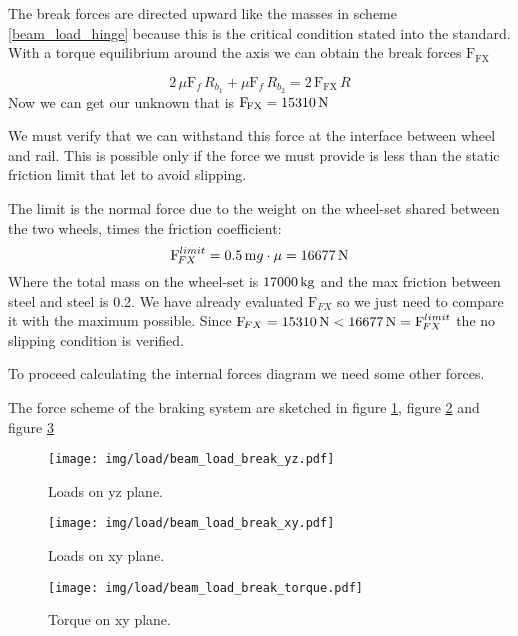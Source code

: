 \documentclass[a4paper,12pt]{article}
\begin{document}
The break forces are directed upward like the masses in scheme \ref{beam_load_hinge} because this is the critical condition stated into the standard.
\\With a torque equilibrium around the axis we can obtain the break forces $\text{F}_{\!\text{FX}}$

\begin{equation}
2\, \mu \text{F}_f \, R_{b_1} + \mu \text{F}_f \, R_{b_2} = 2\, \text{F}_{\!\text{FX}} \, R
\end{equation}
%
Now we can get our unknown that is $\text{F}_{\!\text{FX}} = 15310 \,\text{N}$

We must verify that we can withstand this force at the interface between wheel and rail. This is possible only if the force we must provide is less than the static friction limit that let to avoid slipping.

The limit is the normal force due to the weight on the wheel-set shared between the two wheels, times the friction coefficient:
\begin{equation}
\text{F}_{\!FX}^{limit} = 0.5\, \text{m} g \cdot \mu = 16677 \,\text{N}
\end{equation}
Where the total mass on the wheel-set is $17000 \,\text{kg}$ and the max friction between steel and steel is 0.2.
We have already evaluated $\text{F}_{\!FX}$ so we just need to compare it with the maximum possible. 
Since $\text{F}_{\!FX} = 15310 \,\text{N} < 16677 \,\text{N} = \text{F}_{\!FX}^{limit}$ the no slipping condition is verified.

To proceed calculating the internal forces diagram we need some other forces. 

The force scheme of the braking system are sketched in figure \ref{beam_load_break_yz}, figure \ref{beam_load_break_xy} and figure \ref{beam_load_break_torque}

\begin{figure}[H]
\centering
\caption{Loads on yz plane.}
\texttt{[image: img/load/beam\_load\_break\_yz.pdf]}
\label{beam_load_break_yz}
\end{figure}


\begin{figure}[H]
\centering
\caption{Loads on xy plane.}
\texttt{[image: img/load/beam\_load\_break\_xy.pdf]}
\label{beam_load_break_xy}
\end{figure}


\begin{figure}[H]
\centering
\caption{Torque on xy plane.}
\texttt{[image: img/load/beam\_load\_break\_torque.pdf]}
\label{beam_load_break_torque}
\end{figure}
\end{document}

